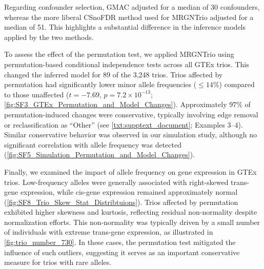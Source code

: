 \documentclass[12pt,letterpaper]{report}
\begin{document}
\begin{doublespace}
Regarding confounder selection, GMAC adjusted for a median of 30 confounders, whereas the more liberal CSnoFDR method used for MRGNTrio adjusted for a median of 51. This highlights a substantial difference in the inference models applied by the two methods.

To assess the effect of the permutation test, we applied MRGNTrio using permutation-based conditional independence tests across all GTEx trios. This changed the inferred model for 89 of the 3,248 trios. Trios affected by permutation had significantly lower minor allele frequencies ($\leq 14\%$) compared to those unaffected ($t=-7.69$, $p=7.2\times10^{-13}$; \autoref{fig:SF3_GTEx_Permutation_and_Model_Changes}). Approximately 97\% of permutation-induced changes were conservative, typically involving edge removal or reclassification as ``Other'' (see \autoref{txt:supptext_document}; Examples 3–4). Similar conservative behavior was observed in our simulation study, although no significant correlation with allele frequency was detected (\autoref{fig:SF5_Simulation_Permutation_and_Model_Changes}).

Finally, we examined the impact of allele frequency on gene expression in GTEx trios. Low-frequency alleles were generally associated with right-skewed trans-gene expression, while cis-gene expression remained approximately normal (\autoref{fig:SF8_Trio_Skew_Stat_Distribtuions}). Trios affected by permutation exhibited higher skewness and kurtosis, reflecting residual non-normality despite normalization efforts. This non-normality was typically driven by a small number of individuals with extreme trans-gene expression, as illustrated in \autoref{fig:trio_number_730}. In these cases, the permutation test mitigated the influence of such outliers, suggesting it serves as an important conservative measure for trios with rare alleles.



\end{doublespace}
\end{document}
